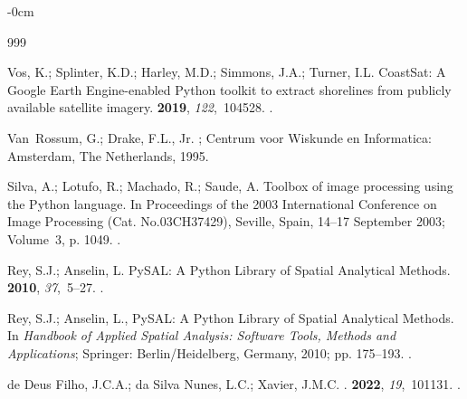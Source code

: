 \documentclass[jimaging,article,accept,pdftex,moreauthors]{Definitions/mdpi}
\begin{document}
\begin{adjustwidth}{-\extralength}{0cm}
\begin{thebibliography}{999}

Vos, K.; Splinter, K.D.; Harley, M.D.; Simmons, J.A.; Turner, I.L.
\newblock CoastSat: A Google Earth Engine-enabled Python toolkit to extract
  shorelines from publicly available satellite imagery.
 {\bf 2019}, {\em
  122},~104528.
.

Van~Rossum, G.; Drake, F.L., Jr.
; Centrum voor Wiskunde en Informatica:
  Amsterdam, The Netherlands, 1995.

Silva, A.; Lotufo, R.; Machado, R.; Saude, A.
\newblock Toolbox of image processing using the Python language.
\newblock In Proceedings of the 2003 International Conference on
  Image Processing (Cat. No.03CH37429), Seville, Spain, 14--17 September 2003; Volume~3, p. 1049.
. %

Rey, S.J.; Anselin, L.
\newblock PySAL: A Python Library of Spatial Analytical Methods.
 {\bf 2010}, {\em 37},~5--27.
.

Rey, S.J.; Anselin, L., PySAL: A Python Library of Spatial Analytical Methods.
\newblock In {\em Handbook of Applied Spatial Analysis: Software Tools, Methods
  and Applications}; Springer: Berlin/Heidelberg, Germany, 2010; pp. 175--193.
.

{de Deus Filho}, J.C.A.; {da Silva Nunes}, L.C.; Xavier, J.M.C.
.
 {\bf 2022}, {\em 19},~101131.
.


\end{thebibliography}
\end{adjustwidth}
\end{document}
